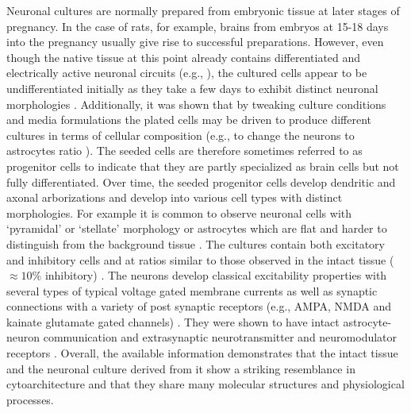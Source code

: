     Neuronal cultures are normally prepared from embryonic tissue at later stages of pregnancy. In the case of rats, for example, brains from embryos at 15-18 days into the pregnancy usually give rise to successful preparations. However, even though the native tissue at this point already contains differentiated and electrically active neuronal circuits (e.g., \cite{easton2014genetic}), the cultured cells appear to be undifferentiated initially as they take a few days to exhibit distinct neuronal morphologies \cite{dichter1978rat}. Additionally, it was shown that by tweaking culture conditions and media formulations the plated cells may be driven to produce different cultures in terms of cellular composition (e.g., to change the neurons to astrocytes ratio \cite{morrow2001sequential}). The seeded cells are therefore sometimes referred to as progenitor cells to indicate that they are partly specialized as brain cells but not fully differentiated. Over time, the seeded progenitor cells develop dendritic and axonal arborizations and develop into various cell types with distinct morphologies. For example it is common to observe neuronal cells with `pyramidal' or `stellate' morphology or astrocytes which are flat and harder to distinguish from the background tissue \cite{dichter1978rat}. The cultures contain both excitatory and inhibitory cells and at ratios similar to those observed in the intact tissue (\(\approx10\%\) inhibitory) \cite{benson1994characterization}. The neurons develop classical excitability properties with several types of typical voltage gated membrane currents as well as synaptic connections with a variety of post synaptic receptors (e.g., AMPA, NMDA and kainate glutamate gated channels) \cite{dichter1978rat,corner2002physiological}. They were shown to have intact astrocyte-neuron communication \cite{wallach2014glutamate} and extrasynaptic neurotransmitter and neuromodulator receptors \cite{eytan2004dopamine,kaufman2012long,swanwick2006development}. Overall, the available information demonstrates that the intact tissue and the neuronal culture derived from it show a striking resemblance in cytoarchitecture and that they share many molecular structures and physiological processes.

